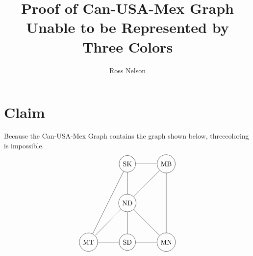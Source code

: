 \documentclass[10 pt]{amsart}
\theoremstyle{definition}
\theoremstyle{remark}
\numberwithin{equation}{subsection}
\begin{document}
\title{Proof of Can-USA-Mex Graph Unable to be Represented by Three Colors}
\author{Ross Nelson}

 \maketitle

\section*{Claim}
Because the Can-USA-Mex Graph contains the graph shown below, three\newline coloring is impossible.
\[
\begin{tikzpicture}
\node[circle, draw] (MT) at (0,0){MT};
\node[circle, draw] (SK) at (2,4){SK};
\node[circle, draw] (ND) at (2,2){ND};
\node[circle, draw] (SD) at (2,0){SD};
\node[circle, draw] (MB) at (4,4){MB};
\node[circle, draw] (MN) at (4,0){MN};
\foreach \from/\to in 
{MT/SK,MT/ND,MT/SD,SK/ND,SK/MB,MB/ND,MB/MN,ND/SD,ND/MN,SD/MN}
\draw (\from) -- (\to);
\end{tikzpicture}
\]
\end{document}
